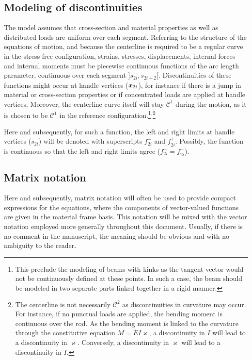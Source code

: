  \subsection{Modeling of discontinuities}
The model assumes that cross-section and material properties as well as distributed loads are uniform over each segment. Referring to the structure of the equations of motion, and because the centerline is required to be a regular curve in the stress-free configuration, strains, stresses, displacements, internal forces and internal moments must be piecewise continuous functions of the arc length parameter, continuous over each segment $]s_{2i},s_{2i+2}[$. Discontinuities of these functions might occur at handle vertices ($\boldsymbol{x}_{2i}$), for instance if there is a jump in material or cross-section properties or if concentrated loads are applied at handle vertices. Moreover, the centerline curve itself will stay $\mathcal{C}^1$ during the motion, as it is chosen to be $\mathcal{C}^1$ in the reference configuration.\footnote{This preclude the modeling of beams with kinks as the tangent vector would not be continuously defined at these points. In such a case, the beam should be modeled in two separate parts linked together in a rigid manner.}\textsuperscript{,}\footnote{The centerline is not necessarily $\mathcal{C}^2$ as discontinuities in curvature may occur. For instance, if no punctual loads are applied, the bending moment is continuous over the rod. As the bending moment is linked to the curvature through the constitutive equation $M = EI\varkappa$, a discontinuity in $I$ will lead to a discontinuity in $\varkappa$. Conversely, a discontinuity in $\varkappa$ will lead to a discontinuity in $I$.}

Here and subsequently, for such a function, the left and right limits at handle vertices ($s_{2i}$) will be denoted with superscripts $f_{2i}^-$ and $f_{2i}^+$. Possibly, the function is continuous so that the left and right limits agree ($f_{2i}^- = f_{2i}^+$).

\subsection{Matrix notation}
Here and subsequently, matrix notation will often be used to provide compact expressions for the equations, where the components of vector-valued functions are given in the material frame basis. This notation will be mixed with the vector notation employed  more generally throughout this document. Usually, if there is no comment in the manuscript, the meaning should be obvious and with no ambiguity to the reader.

